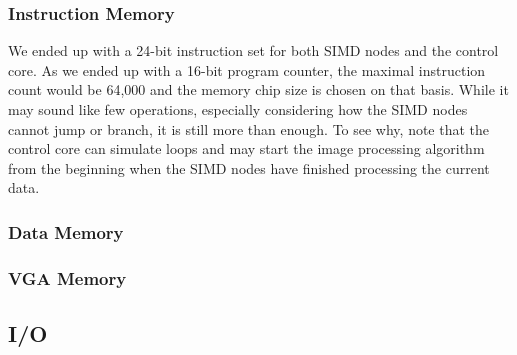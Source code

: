 \subsubsection*{Instruction Memory}

We ended up with a 24-bit instruction set for both \ac{SIMD} nodes and the
control core. As we ended up with a 16-bit program counter, the maximal
instruction count would be 64,000 and the memory chip size is chosen on that
basis. While it may sound like few operations, especially considering how the
\ac{SIMD} nodes cannot jump or branch, it is still more than enough. To see why,
note that the control core can simulate loops and may start the image processing
algorithm from the beginning when the \ac{SIMD} nodes have finished processing
the current data.

\subsubsection*{Data Memory}

\subsubsection*{VGA Memory}

\subsection{I/O}

